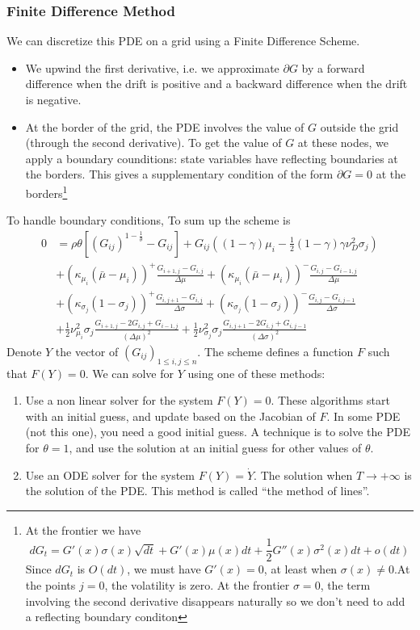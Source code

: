 \documentclass[english]{article}
\begin{document}
\subsubsection{Finite Difference Method}
We can discretize this PDE on a grid using a Finite Difference Scheme. 
\begin{itemize}
	\item We upwind the first derivative, i.e. we approximate $\partial G$ by a forward difference when the drift is positive and a backward difference when the drift is negative. 
	\item At the border of the grid, the PDE involves the value of $G$ outside the grid (through the second derivative). To get the value of $G$ at these nodes, we apply a boundary counditions: state variables have reflecting boundaries at the borders. This gives a supplementary condition of the form $\partial G = 0$ at the borders\footnote{At the frontier we have $$dG_{t} = G'(x) \sigma(x) \sqrt{dt} + G'(x)\mu(x) dt + \frac{1}{2}G''(x)\sigma^2(x)dt + o(dt)$$
	Since $dG_t$ is $O(dt)$, we must have $G'(x) = 0$, at least when $\sigma(x) \neq 0$.At the points $j = 0$, the volatility is zero. 
	At the frontier $\sigma = 0$, the term involving the second derivative disappears naturally so we don't need to add a reflecting boundary conditon}
\end{itemize}
To handle boundary conditions, 
To sum up the scheme is 
\begin{align*}
	0&= \rho \theta[(G_{ij})^{1-\frac{1}{\theta}}- G_{ij}]+G_{ij}((1-\gamma)\mu_i-\frac{1}{2}(1-\gamma)\gamma\nu_D^2\sigma_j)\\
	&+(\kappa_{\mu_i}(\bar{\mu}-\mu_i))^+\frac{G_{i+1, j}-G_{i, j}}{\Delta \mu}+(\kappa_{\mu_i}(\bar{\mu}-\mu_i))^-\frac{G_{i, j}-G_{i-1, j}}{\Delta \mu}\\
	&+(\kappa_{\sigma_j}(1-\sigma_j))^+\frac{G_{i, j+1}-G_{i,j}}{\Delta \sigma}+(\kappa_{\sigma_j}(1-\sigma_j))^-\frac{G_{i, j}-G_{i,j-1}}{\Delta \sigma}\\
	&+\frac{1}{2}\nu_{\mu_i}^{2}\sigma_j\frac{G_{i+1, j} - 2 G_{i, j} + G_{i-1, j}}{(\Delta\mu)^2}+\frac{1}{2}\nu_{\sigma_j}^{2}\sigma_j\frac{G_{i, j+1} - 2 G_{i, j} + G_{i, j-1}}{(\Delta\sigma)^2}
\end{align*}
Denote $Y$ the vector of  $(G_{ij})_{1 \leq i,j\leq n}$. The scheme  defines a function $F$ such that $F(Y) = 0$. We can solve for $Y$ using one of these methods:
\begin{enumerate}
	\item Use a non linear solver for the system $F(Y) = 0$. These algorithms start with an initial guess, and update based on the Jacobian of $F$. In some PDE (not this one), you need a good initial guess. A technique is to solve the PDE for $\theta = 1$, and use the solution at an initial guess for other values of $\theta$.
	\item Use an ODE solver for the system $F(Y) = \dot{Y}$. The solution when $T\rightarrow +\infty$ is the solution of the PDE. This method is called ``the method of lines''.
\end{enumerate}
\end{document}
